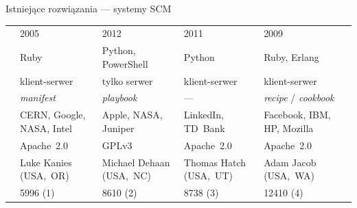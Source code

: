 \documentclass[notes,polish,xcolor=dvipsnames,aspectratio=169]{beamer}
\begin{document}
\begin{frame}[fragile]{Istniejące rozwiązania --- systemy SCM}
\begin{adjustbox}{center}
	\tiny
	\begin{tabular}{L{1.8cm}|M{2cm}|M{2cm}|M{2cm}|M{2cm}N}
		                               & \puppetlogo               & \ansiblelogo             & \saltlogo              & \cheflogo                       \\\hline\hline
		      & 2005                      & 2012                     & 2011                   & 2009                            \\\hline
		              & Ruby                      & Python, PowerShell       & Python                 & Ruby, Erlang                    \\\hline
		              & klient-serwer             & tylko serwer             & klient-serwer          & klient-serwer                   \\\hline
		  & \emph{manifest}           & \emph{playbook}          & ---                    & \emph{recipe} / \emph{cookbook} \\\hline
		  & CERN, Google, NASA, Intel & Apple, NASA, Juniper     & LinkedIn, TD~Bank      & Facebook, IBM, HP, Mozilla      \\\hline
		           & Apache~2.0                & GPLv3                    & Apache~2.0             & Apache~2.0                      \\\hline
		         & Luke Kanies (USA,~OR)     & Michael Dehaan (USA,~NC) & Thomas Hatch (USA,~UT) & Adam Jacob (USA,~WA)            \\\hline
		\fixedcell{\popularity}        & 5996 (1)                  & 8610 (2)                 & 8738 (3)               & 12410 (4)
	\end{tabular}
\end{adjustbox}
\vfill

\end{frame}
\end{document}
